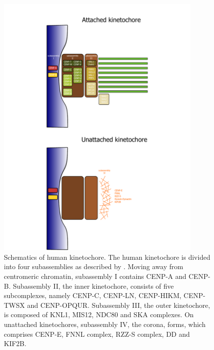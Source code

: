 \begin{figure}[htbp]
  \centering
  \includegraphics[width=0.9\textwidth]{chapter1/figures/kinetochore.pdf}
  \caption[Schematics of human kinetochore]{Schematics of human kinetochore. The human kinetochore is divided into four subassemblies as described by \citep{McAinsh2022TheKinetochores}. Moving away from centromeric chromatin, subassembly I contains CENP-A and CENP-B. Subassembly II, the inner kinetochore, consists of five subcomplexes, namely CENP-C, CENP-LN, CENP-HIKM, CENP-TWSX and CENP-OPQUR. Subassembly III, the outer kinetochore, is composed of KNL1, MIS12, NDC80 and SKA complexes. On unattached kinetochores, subassembly IV, the corona, forms, which comprises CENP-E, FNNL complex, RZZ-S complex, DD and KIF2B. }
  \label{fig:KTSchematics}
\end{figure}

